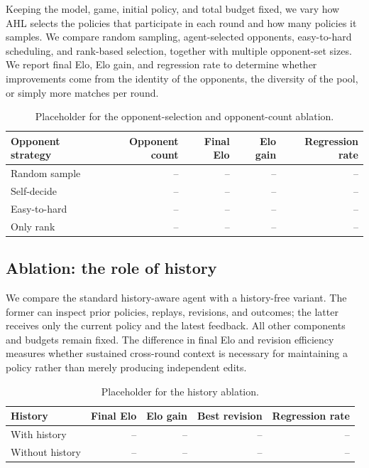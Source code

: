 Keeping the model, game, initial policy, and total budget fixed, we vary how AHL
selects the policies that participate in each round and how many policies it samples.
We compare random sampling, agent-selected opponents, easy-to-hard scheduling, and
rank-based selection, together with multiple opponent-set sizes. We report final Elo,
Elo gain, and regression rate to determine whether improvements come from the identity
of the opponents, the diversity of the pool, or simply more matches per round.

\begin{table}[t]
\centering\scriptsize
\begin{tabular}{lrrrr}
\toprule
Opponent strategy & Opponent count & Final Elo & Elo gain & Regression rate \\
\midrule
Random sample & -- & -- & -- & -- \\
Self-decide & -- & -- & -- & -- \\
Easy-to-hard & -- & -- & -- & -- \\
Only rank & -- & -- & -- & -- \\
\bottomrule
\end{tabular}
\caption{Placeholder for the opponent-selection and opponent-count ablation.}
\label{tab:opponent-ablation}
\end{table}

\subsection{Ablation: the role of history}
\label{sec:exp-history-ablation}

We compare the standard history-aware agent with a history-free variant. The former
can inspect prior policies, replays, revisions, and outcomes; the latter receives only
the current policy and the latest feedback. All other components and budgets remain
fixed. The difference in final Elo and revision efficiency measures whether sustained
cross-round context is necessary for maintaining a policy rather than merely producing
independent edits.

\begin{table}[t]
\centering\scriptsize
\begin{tabular}{lrrrr}
\toprule
History & Final Elo & Elo gain & Best revision & Regression rate \\
\midrule
With history & -- & -- & -- & -- \\
Without history & -- & -- & -- & -- \\
\bottomrule
\end{tabular}
\caption{Placeholder for the history ablation.}
\label{tab:history-ablation}
\end{table}
